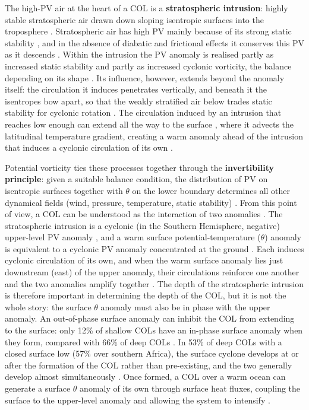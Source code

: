 \documentclass{article}
\begin{document}
The high-PV air at the heart of a COL is a \textbf{stratospheric intrusion}: highly stable stratospheric air drawn down sloping isentropic surfaces into the troposphere \cite{Hoskins1985, Stull2015, Barnes2022main}.
Stratospheric air has high PV mainly because of its strong static stability \cite{Hoskins1985, Grise2010}, and in the absence of diabatic and frictional effects it conserves this PV as it descends \cite{Stull2015}.
Within the intrusion the PV anomaly is realised partly as increased static stability and partly as increased cyclonic vorticity, the balance depending on its shape \cite{Hoskins1985}.
Its influence, however, extends beyond the anomaly itself: the circulation it induces penetrates vertically, and beneath it the isentropes bow apart, so that the weakly stratified air below trades static stability for cyclonic rotation \cite{Hoskins1985}.
The circulation induced by an intrusion that reaches low enough can extend all the way to the surface \cite{Barnes2022main}, where it advects the latitudinal temperature gradient, creating a warm anomaly ahead of the intrusion that induces a cyclonic circulation of its own \cite{Hoskins1985}.

Potential vorticity ties these processes together through the \textbf{invertibility principle}: given a suitable balance condition, the distribution of PV on isentropic surfaces together with $\theta$ on the lower boundary determines all other dynamical fields (wind, pressure, temperature, static stability) \cite{Hoskins1985}.
From this point of view, a COL can be understood as the interaction of two anomalies \cite{Barnes2021col}.
The stratospheric intrusion is a cyclonic (in the Southern Hemisphere, negative) upper-level PV anomaly \cite{Barnes2022main}, and a warm surface potential-temperature ($\theta$) anomaly is equivalent to a cyclonic PV anomaly concentrated at the ground \cite{Hoskins1985}.
Each induces cyclonic circulation of its own, and when the warm surface anomaly lies just downstream (east) of the upper anomaly, their circulations reinforce one another and the two anomalies amplify together \cite{Hoskins1985, Barnes2021col}.
The depth of the stratospheric intrusion is therefore important in determining the depth of the COL, but it is not the whole story: the surface $\theta$ anomaly must also be in phase with the upper anomaly.
An out-of-phase surface anomaly can inhibit the COL from extending to the surface: only 12\% of shallow COLs have an in-phase surface anomaly when they form, compared with 66\% of deep COLs \cite{Barnes2021col}.
In 53\% of deep COLs with a closed surface low (57\% over southern Africa), the surface cyclone develops at or after the formation of the COL rather than pre-existing, and the two generally develop almost simultaneously \cite{Barnes2021col}.
Once formed, a COL over a warm ocean can generate a surface $\theta$ anomaly of its own through surface heat fluxes, coupling the surface to the upper-level anomaly and allowing the system to intensify \cite{SingletonReason2007, Barnes2021col}.
\end{document}
